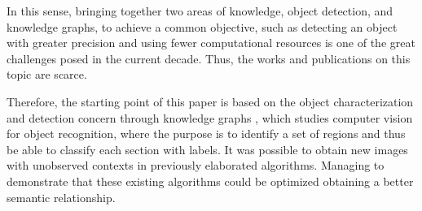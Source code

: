 In this sense, bringing together two areas of knowledge, object detection, and 
knowledge graphs, to achieve a common objective, such as detecting an object 
with greater precision and using fewer computational resources is one of the 
great challenges posed in the current decade. Thus, the works and 
publications on this topic are scarce.

Therefore, the starting point of this paper is based on the object 
characterization and detection concern through knowledge graphs \cite{Fang}, 
which studies computer vision for object recognition, where the purpose is 
to identify a set of regions and thus be able to classify each section with 
labels. It was possible to obtain new images with unobserved contexts in 
previously elaborated algorithms. Managing to demonstrate that these existing 
algorithms could be optimized obtaining a better semantic relationship.
